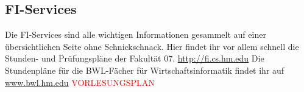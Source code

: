 \subsection{FI-Services}
Die FI-Services sind alle wichtigen Informationen gesammelt auf einer 
übersichtlichen Seite ohne Schnickschnack. Hier findet ihr vor allem 
schnell die Stunden- und Prüfungspläne der Fakultät 07. 
\url{http://fi.cs.hm.edu}
Die Stundenpläne für die BWL-Fächer für Wirtschaftsinformatik 
findet ihr auf \url{www.bwl.hm.edu}  \textcolor{red}{VORLESUNGSPLAN}
